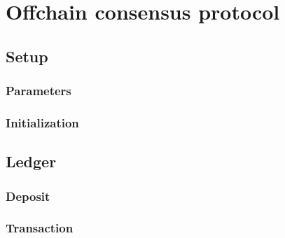 \documentclass[../hydrozoa.tex]{subfiles}
\begin{document}
\chapter{Offchain consensus protocol}%
\label{h:offchain-consensus-protocol}

\section{Setup}%
\label{h:consensus-setup}

\subsection{Parameters}%
\label{h:consensus-parameters}




\subsection{Initialization}%
\label{h:consensus-intitialization}



\section{Ledger}%
\label{h:consensus-ledger}

\subsection{Deposit}%
\label{h:consensus-deposit}



\subsection{Transaction}%
\label{h:consensus-transaction}
\end{document}
